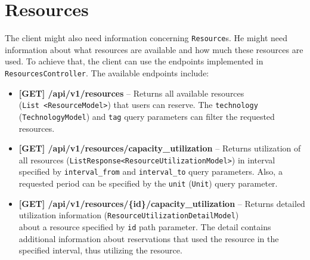 \section{Resources}
The client might also need information concerning \texttt{Resource}s. He might need information about what resources are available and how much these resources are used.
To achieve that, the client can use the endpoints implemented in \texttt{ResourcesController}.
The available endpoints include:
\begin{itemize}
    \item \textbf{[GET] /api/v1/resources} -- Returns all available resources (\texttt{List\ <ResourceModel>}) that users can reserve. The \texttt{technology} (\texttt{Tech\-nologyModel}) and \texttt{tag} query parameters can filter the requested resources.
    \item \textbf{[GET] /api/v1/resources/capacity\_utilization} -- Returns utilization of all resources (\texttt{ListResponse<ResourceUtilizationModel>}) in interval specified by \texttt{interval\_from} and \texttt{interval\_to} query parameters. Also, a requested period can be specified by the \texttt{unit} (\texttt{Unit}) query parameter.
    \item \textbf{[GET] /api/v1/resources/\{id\}/capacity\_utilization} -- Returns detailed utilization information (\texttt{ResourceUtilizationDetailModel}) \\about a resource specified by \texttt{id} path parameter. The detail contains additional information about reservations that used the resource in the specified interval, thus utilizing the resource.
\end{itemize}
